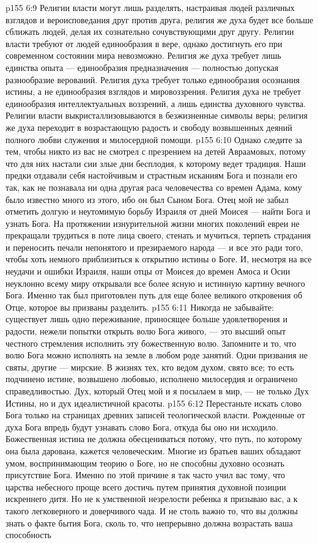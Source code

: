 \vs p155 6:9 Религии власти могут лишь разделять, настраивая людей различных взглядов и вероисповедания друг против друга, религия же духа будет все больше сближать людей, делая их сознательно сочувствующими друг другу. Религии власти требуют от людей единообразия в вере, однако достигнуть его при современном состоянии мира невозможно. Религия же духа требует лишь единства опыта --- единообразия предназначения --- полностью допуская разнообразие верований. Религия духа требует только единообразия осознания истины, а не единообразия взглядов и мировоззрения. Религия духа не требует единообразия интеллектуальных воззрений, а лишь единства духовного чувства. Религии власти выкристаллизовываются в безжизненные символы веры; религия же духа переходит в возрастающую радость и свободу возвышенных деяний полного любви служения и милосердной помощи.
\vs p155 6:10 Однако следите за тем, чтобы никто из вас не смотрел с презрением на детей Авраамовых, потому что для них настали сии злые дни бесплодия, к которому ведет традиция. Наши предки отдавали себя настойчивым и страстным исканиям Бога и познали его так, как не познавала ни одна другая раса человечества со времен Адама, кому было известно много из этого, ибо он был Сыном Бога. Отец мой не забыл отметить долгую и неутомимую борьбу Израиля от дней Моисея --- найти Бога и узнать Бога. На протяжении изнурительной жизни многих поколений евреи не прекращали трудиться в поте лица своего, стенать и мучиться, терпеть страдания и переносить печали непонятого и презираемого народа --- и все это ради того, чтобы хоть немного приблизиться к открытию истины о Боге. И, несмотря на все неудачи и ошибки Израиля, наши отцы от Моисея до времен Амоса и Осии неуклонно всему миру открывали все более ясную и истинную картину вечного Бога. Именно так был приготовлен путь для еще более великого откровения об Отце, которое вы призваны разделить.
\vs p155 6:11 Никогда не забывайте: существует лишь одно переживание, приносящее больше удовлетворения и радости, нежели попытки открыть волю Бога живого, --- это высший опыт честного стремления исполнить эту божественную волю. Запомните и то, что волю Бога можно исполнять на земле в любом роде занятий. Одни призвания не святы, другие --- мирские. В жизнях тех, кто ведом духом, свято все; то есть подчинено истине, возвышено любовью, исполнено милосердия и ограничено справедливостью. Дух, который Отец мой и я посылаем в мир, --- не только Дух Истины, но и дух идеалистичной красоты.
\vs p155 6:12 Перестаньте искать слово Бога только на страницах древних записей теологической власти. Рожденные от духа Бога впредь будут узнавать слово Бога, откуда бы оно ни исходило. Божественная истина не должна обесцениваться потому, что путь, по которому она была дарована, кажется человеческим. Многие из братьев ваших обладают умом, воспринимающим теорию о Боге, но не способны духовно осознать присутствие Бога. Именно по этой причине я так часто учил вас тому, что царства небесного проще всего достичь путем принятия духовной позиции искреннего дитя. Но не к умственной незрелости ребенка я призываю вас, а к  такого легковерного и доверчивого чада. И не столь важно то, что вы должны знать о факте бытия Бога, сколь то, что непрерывно должна возрастать ваша способность 

